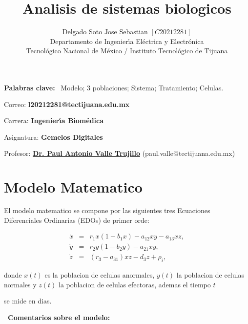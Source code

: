 \documentclass[letterpaper,11pt]{article}
\begin{document}
\title{Analisis de sistemas biologicos}
\author{Delgado Soto Jose Sebastian $\left[ C20212281\right] $ \\
Departamento de Ingenier\'{\i}a El\'{e}ctrica y Electr\'{o}nica\\
Tecnol\'{o}gico Nacional de M\'{e}xico / Instituto Tecnol\'{o}gico de Tijuana%
}
\maketitle

\noindent \textbf{Palabras clave: }\ Modelo; 3 poblaciones; Sistema;
Tratamiento; Celulas.

\noindent

\noindent Correo: \textbf{l20212281@tectijuana.edu.mx}

\noindent \noindent Carrera: \textbf{Ingenier\'{\i}a Biom\'{e}dica }

\noindent Asignatura: \textbf{Gemelos Digitales}

\noindent Profesor: \href{https://biomath.xyz/}{\textbf{Dr. Paul Antonio
Valle Trujillo}} (paul.valle@tectijuana.edu.mx)

\section{Modelo Matematico}

El modelo matematico se compone por las siguientes tres Ecuaciones
Diferenciales Ordinarias (EDOs) de primer orde:

\begin{eqnarray*}
\dot{x} &=&r_{1}x\left( 1-b_{1}x\right) -a_{12}xy-a_{13}xz, \\
\dot{y} &=&r_{2}y\left( 1-b_{2}y\right) -a_{21}xy, \\
\dot{z} &=&\left( r_{3}-a_{31}\right) xz-d_{3}z+\rho _{i},
\end{eqnarray*}

donde $x\left( t\right) $ es la poblacion de celulas anormales, $y\left(
t\right) $ la poblacion de celulas normales y $z\left( t\right) $ la
poblacion de celulas efectoras, ademas el tiempo $t$ \ \ 

se mide en dias.

\textbf{\bigskip\ Comentarios sobre el modelo:}
\end{document}
